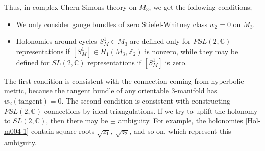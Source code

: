 \documentclass[a4paper,11pt]{article}
\def\BC{{\mathbb C}}
\def\BZ{{\mathbb Z}}
\begin{document}
Thus, in complex Chern-Simons theory on $M_3$, we get the following conditions;
\begin{itemize}
\item We only consider gauge bundles of zero Stiefel-Whitney class $w_2=0$ on $M_3$.
\item Holonomies around cycles $S^1_M \in M_3$ are defined only for $PSL(2,\BC)$ representations if $[S^1_M] \in H_1(M_3,\BZ_2)$ is nonzero,
while they may be defined for $SL(2,\BC)$ representations if $[S^1_M]$ is zero.

\end{itemize}
The first condition is consistent with the connection coming from hyperbolic metric, because the tangent bundle of any orientable 3-manifold has $w_2(\text{tangent})=0$.
The second condition is consistent with constructing $PSL(2,\BC)$ connections by ideal triangulations. 
If we try to uplift the holonomy to $SL(2,\BC)$, then there may be 
$\pm$ ambiguity. For example, the holonomies \eqref{Hol-m004-1} contain square roots $\sqrt{z_1},~\sqrt{z_2}$, and so on, which represent this ambiguity.














\end{document}
